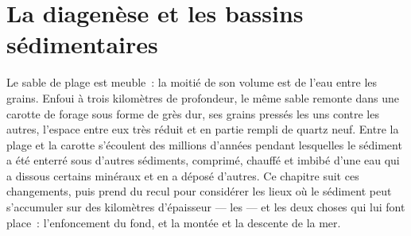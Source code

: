 \chapter{La diagenèse et les bassins sédimentaires}\label{ch:b1:diagenesis-basins}

Le sable de plage est meuble~: la moitié de son volume est de l'eau entre les grains. Enfoui
à trois kilomètres de profondeur, le même sable remonte dans une carotte de forage sous forme de
grès dur, ses grains pressés les uns contre les autres, l'espace entre eux très réduit
et en partie rempli de quartz neuf. Entre la plage et la carotte s'écoulent des millions d'années pendant lesquelles
le sédiment a été enterré sous d'autres sédiments, comprimé, chauffé et imbibé
d'une eau qui a dissous certains minéraux et en a déposé d'autres. Ce chapitre suit
ces changements, puis prend du recul pour considérer les lieux où le sédiment peut s'accumuler
sur des kilomètres d'épaisseur --- les  --- et les deux choses qui lui
font place~: l'enfoncement du fond, et la montée et la descente de la mer.

